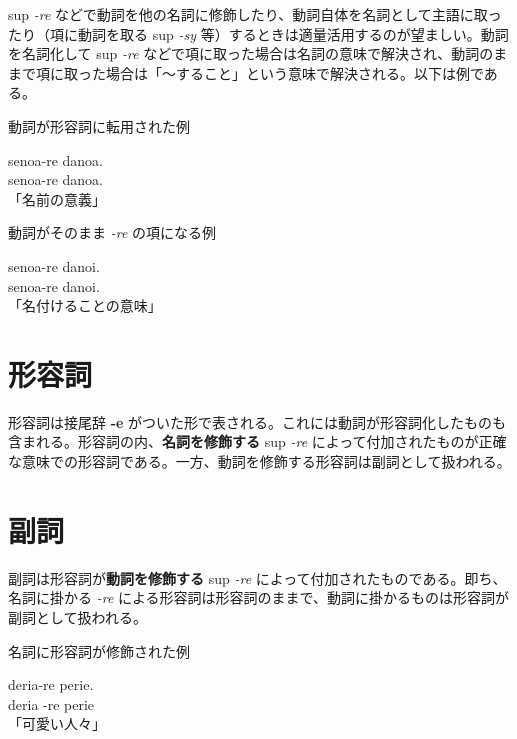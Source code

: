 sup \emph{-re} などで動詞を他の名詞に修飾したり、動詞自体を名詞として主語に取ったり（項に動詞を取る sup \emph{-sy} 等）するときは適量活用するのが望ましい。動詞を名詞化して sup \emph{-re} などで項に取った場合は名詞の意味で解決され、動詞のままで項に取った場合は「～すること」という意味で解決される。以下は例である。

\begin{itembox}[l]{動詞が形容詞に転用された例}
    \begin{pindent}
        \noindent
        senoa-re danoa. \\
        senoa-re danoa. \\
        「名前の意義」
    \end{pindent}
\end{itembox}

\begin{itembox}[l]{動詞がそのまま \emph{-re} の項になる例}
    \begin{pindent}
        senoa-re danoi. \\
        senoa-re danoi. \\
        「名付けることの意味」
        \noindent
    \end{pindent}
\end{itembox}

\section{形容詞}

形容詞は接尾辞 \textbf{-e} がついた形で表される。これには動詞が形容詞化したものも含まれる。形容詞の内、\textbf{名詞を修飾する} sup \emph{-re} によって付加されたものが正確な意味での形容詞である。一方、動詞を修飾する形容詞は副詞として扱われる。

\section{副詞}

副詞は形容詞が\textbf{動詞を修飾する} sup \emph{-re} によって付加されたものである。即ち、名詞に掛かる \emph{-re} による形容詞は形容詞のままで、動詞に掛かるものは形容詞が副詞として扱われる。

\begin{itembox}[l]{名詞に形容詞が修飾された例}
    \begin{pindent}
        \noindent
        deria-re perie. \vspace{-1mm} \\
        deria -re perie \vspace{-1mm} \\
        「可愛い人々」
    \end{pindent}
\end{itembox}

